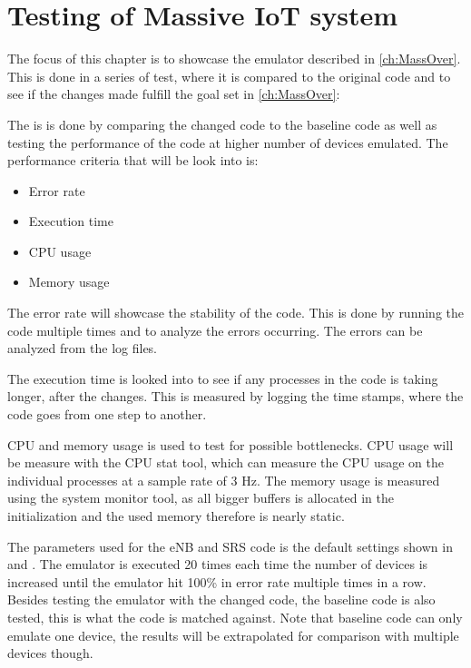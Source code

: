 \chapter{Testing of Massive IoT system} \label{ch:mass_test}
The focus of this chapter is to showcase the emulator described in \autoref{ch:MassOver}. This is done in a series of test, where it is compared to the original code and to see if the changes made fulfill the goal set in \autoref{ch:MassOver}:


The is is done by comparing the changed code to the baseline code as well as testing the performance of the code at higher number of devices emulated.
The performance criteria that will be look into is:

\begin{itemize}
\item Error rate
\item Execution time
\item CPU usage
\item Memory usage
\end{itemize}

The error rate will showcase the stability of the code. This is done by running the code multiple times and to analyze the errors occurring. The errors can be analyzed from the log files.

The execution time is looked into to see if any processes in the code is taking longer, after the changes. This is measured by logging the time stamps, where the code goes from one step to another. 

CPU and memory usage is used to test for possible bottlenecks. CPU usage will be measure with the CPU stat tool, which can measure the CPU usage on the individual processes at a sample rate of 3 Hz. The memory usage is measured using the system monitor tool, as all bigger buffers is allocated in the initialization and the used memory therefore is nearly static. 

The parameters used for the eNB and SRS code is the default settings shown in  and . The emulator is executed 20 times each time the number of devices is increased until the emulator hit 100\% in error rate multiple times in a row. Besides testing the emulator with the changed code, the baseline code is also tested, this is what the code is matched against. Note that baseline code can only emulate one device, the results will be extrapolated for comparison with multiple devices though.

